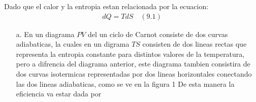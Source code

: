 \documentclass[a4paper]{article}
\begin{document}
    \begin{answer}
        Dado que el calor y la entropia estan relacionada por la ecuacion:
        \begin{align*}
            dQ = TdS \quad (9.1)
        \end{align*}
        \begin{itemize}
            \item [a.] En un diagrama $PV$ del un ciclo de Carnot consiste de dos curvas adiabaticas, la cuales en un digrama $TS$ consisten de dos lineas rectas que representa la entropia constante para distintos valores de la temperatura, pero a difrencia del diagrama anterior, este diagrama tambien consistira de dos curvas isotermicas representadas por dos lineas horizontales conectando las dos lineas adiabaticas, como se ve en la figura 1
            De esta manera la eficiencia va estar dada por 
    

\end{itemize}
\end{answer}
\end{document}
